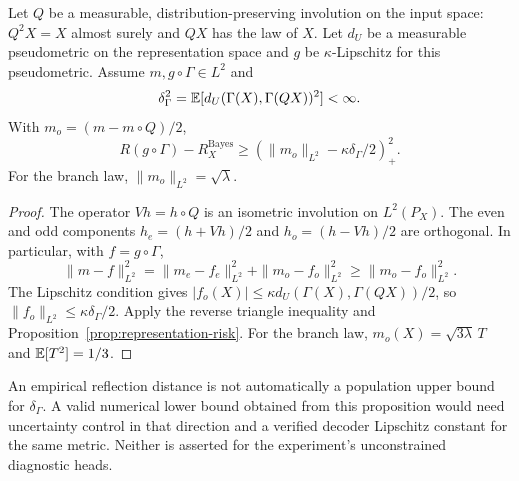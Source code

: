 \begin{proposition}
\label{prop:approx-symmetry}
Let $Q$ be a measurable, distribution-preserving involution on the input
space: $Q^2X=X$ almost surely and $QX$ has the law of $X$.
Let $d_U$ be a measurable pseudometric on the representation space and
$g$ be $\kappa$-Lipschitz for this pseudometric. Assume
$m,g\circ\Gamma\in L^2$ and
\[
 \delta_\Gamma^2
 =\mathbb{E}[d_U(\Gamma(X),\Gamma(QX))^2]<\infty.
\]
With $m_o=(m-m\circ Q)/2$,
\[
 R(g\circ\Gamma)-R_X^{\mathrm{Bayes}}
 \geq (\|m_o\|_{L^2}-\kappa\delta_\Gamma/2)_+^2.
\]
For the branch law, $\|m_o\|_{L^2}=\sqrt\lambda$.
\end{proposition}
\begin{proof}
The operator $Vh=h\circ Q$ is an isometric involution on $L^2(P_X)$.
The even and odd components $h_e=(h+Vh)/2$ and $h_o=(h-Vh)/2$
are orthogonal. In particular, with $f=g\circ\Gamma$,
\[
 \|m-f\|_{L^2}^2
 =\|m_e-f_e\|_{L^2}^2+\|m_o-f_o\|_{L^2}^2
 \geq\|m_o-f_o\|_{L^2}^2.
\]
The Lipschitz condition gives
$|f_o(X)|\leq\kappa d_U(\Gamma(X),\Gamma(QX))/2$, so
$\|f_o\|_{L^2}\leq\kappa\delta_\Gamma/2$.
Apply the reverse triangle inequality and
Proposition~\ref{prop:representation-risk}.
For the branch law, $m_o(X)=\sqrt{3\lambda}\,T$ and
$\mathbb{E}[T^2]=1/3$.
\end{proof}

An empirical reflection distance is not automatically a population upper
bound for $\delta_\Gamma$. A valid numerical lower bound obtained from
this proposition would need uncertainty control in that direction and a
verified decoder Lipschitz constant for the same metric. Neither is
asserted for the experiment's unconstrained diagnostic heads.

